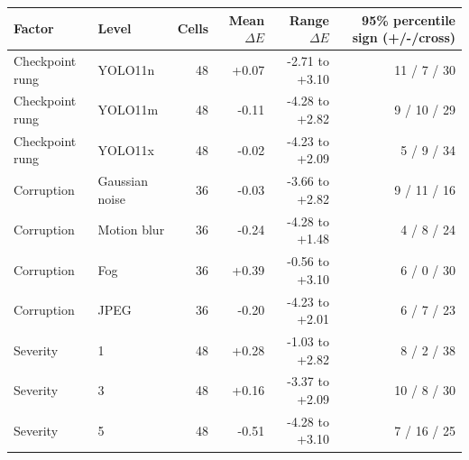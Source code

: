 \begin{tabular}{llrrrr}
\toprule
Factor & Level & Cells & Mean $\Delta E$ & Range $\Delta E$ & 95\% percentile sign (+/-/cross) \\
\midrule
Checkpoint rung & YOLO11n & 48 & +0.07 & -2.71 to +3.10 & 11 / 7 / 30 \\
Checkpoint rung & YOLO11m & 48 & -0.11 & -4.28 to +2.82 & 9 / 10 / 29 \\
Checkpoint rung & YOLO11x & 48 & -0.02 & -4.23 to +2.09 & 5 / 9 / 34 \\
Corruption & Gaussian noise & 36 & -0.03 & -3.66 to +2.82 & 9 / 11 / 16 \\
Corruption & Motion blur & 36 & -0.24 & -4.28 to +1.48 & 4 / 8 / 24 \\
Corruption & Fog & 36 & +0.39 & -0.56 to +3.10 & 6 / 0 / 30 \\
Corruption & JPEG & 36 & -0.20 & -4.23 to +2.01 & 6 / 7 / 23 \\
Severity & 1 & 48 & +0.28 & -1.03 to +2.82 & 8 / 2 / 38 \\
Severity & 3 & 48 & +0.16 & -3.37 to +2.09 & 10 / 8 / 30 \\
Severity & 5 & 48 & -0.51 & -4.28 to +3.10 & 7 / 16 / 25 \\
\bottomrule
\end{tabular}
